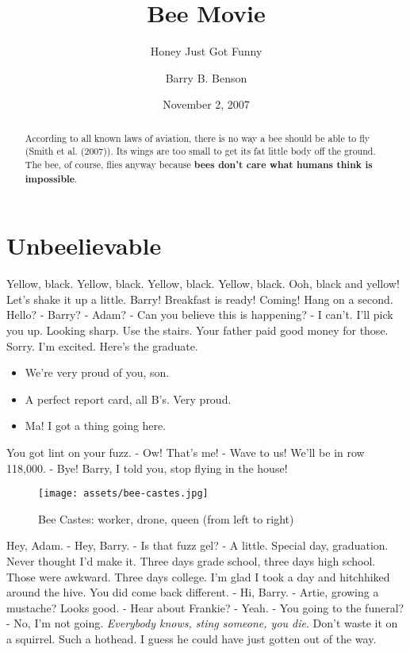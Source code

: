 \documentclass[
  letterpaper,
  twocolumn]{article}
\title{Bee Movie}
\subtitle{Honey Just Got Funny}
\author{Barry B. Benson}
\date{November 2, 2007}
\providecommand{\tightlist}{%
  \setlength{\itemsep}{0pt}\setlength{\parskip}{0pt}}
\begin{document}
\maketitle
\begin{abstract}
According to all known laws of aviation, there is no way a bee should be
able to fly (Smith et al. (2007)). Its wings are too small to get its
fat little body off the ground. The bee, of course, flies anyway because
\textbf{bees don't care what humans think is impossible}.
\end{abstract}

\hypertarget{unbeelievable}{%
\section{Unbeelievable}\label{unbeelievable}}

Yellow, black. Yellow, black. Yellow, black. Yellow, black. Ooh, black
and yellow! Let's shake it up a little. Barry! Breakfast is ready!
Coming! Hang on a second. Hello? - Barry? - Adam? - Can you believe this
is happening? - I can't. I'll pick you up. Looking sharp. Use the
stairs. Your father paid good money for those. Sorry. I'm excited.
Here's the graduate.

\begin{itemize}
\tightlist
\item
  We're very proud of you, son.
\item
  A perfect report card, all B's. Very proud.
\item
  Ma! I got a thing going here.
\end{itemize}

You got lint on your fuzz. - Ow! That's me! - Wave to us! We'll be in
row 118,000. - Bye! Barry, I told you, stop flying in the house!

\begin{figure}
\centering
\texttt{[image: assets/bee-castes.jpg]}
\caption{Bee Castes: worker, drone, queen (from left to right)}
\end{figure}

Hey, Adam. - Hey, Barry. - Is that fuzz gel? - A little. Special day,
graduation. Never thought I'd make it. Three days grade school, three
days high school. Those were awkward. Three days college. I'm glad I
took a day and hitchhiked around the hive. You did come back different.
- Hi, Barry. - Artie, growing a mustache? Looks good. - Hear about
Frankie? - Yeah. - You going to the funeral? - No, I'm not going.
\emph{Everybody knows, sting someone, you die}. Don't waste it on a
squirrel. Such a hothead. I guess he could have just gotten out of the
way.
\end{document}
